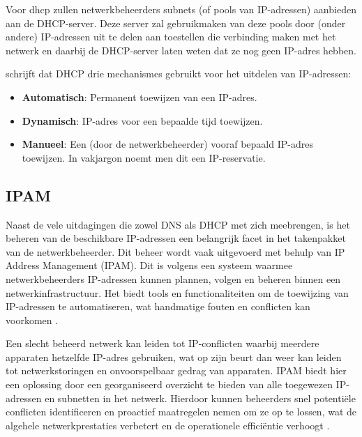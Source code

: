 Voor \acrshort{dhcp} zullen netwerkbeheerders subnets (of pools van IP-adressen) aanbieden aan de DHCP-server. Deze server zal gebruikmaken van deze pools door (onder andere) IP-adressen uit te delen aan toestellen die verbinding maken met het netwerk en daarbij de DHCP-server laten weten dat ze nog geen IP-adres hebben.

\textcite{Droms1997} schrijft dat DHCP drie mechanismes gebruikt voor het uitdelen van IP-adressen:
\begin{itemize}
    \item \textbf{Automatisch}: Permanent toewijzen van een IP-adres.
    \item \textbf{Dynamisch}: IP-adres voor een bepaalde tijd toewijzen.
    \item \textbf{Manueel}: Een (door de netwerkbeheerder) vooraf bepaald IP-adres toewijzen. In vakjargon noemt men dit een IP-reservatie.
\end{itemize}

\subsection{IPAM}
Naast de vele uitdagingen die zowel DNS als DHCP met zich meebrengen, is het beheren van de beschikbare IP-adressen een belangrijk facet in het takenpakket van de netwerkbeheerder. Dit beheer wordt vaak uitgevoerd met behulp van IP Address Management (IPAM). 
Dit is volgens \textcite{Rooney2020} een systeem waarmee netwerkbeheerders IP-adressen kunnen plannen, volgen en beheren binnen een netwerkinfrastructuur. 
Het biedt tools en functionaliteiten om de toewijzing van IP-adressen te automatiseren, wat handmatige fouten en conflicten kan voorkomen \autocite{Rooney2020}.

Een slecht beheerd netwerk kan leiden tot IP-conflicten waarbij meerdere apparaten hetzelfde IP-adres gebruiken, wat op zijn beurt dan weer kan leiden tot netwerkstoringen en onvoorspelbaar gedrag van apparaten. IPAM biedt hier een oplossing door een georganiseerd overzicht te bieden van alle toegewezen IP-adressen en subnetten in het netwerk. Hierdoor kunnen beheerders snel potentiële conflicten identificeren en proactief maatregelen nemen om ze op te lossen, wat de algehele netwerkprestaties verbetert en de operationele efficiëntie verhoogt \autocite{Rooney2020}.

